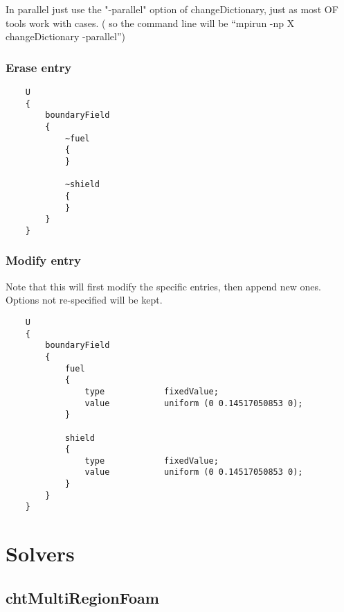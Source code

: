 \documentclass[a4paper, 12pt]{article}
\numberwithin{equation}{section}
\begin{document}
    In parallel just use the "-parallel" option of changeDictionary, just as most OF tools work with cases.
    ( so the command line will be ``mpirun -np X changeDictionary -parallel'')

    \subsubsection{Erase entry}
    \begin{minipage}{\textwidth}
    \vspace{12pt}
    {
    \begin{verbatim}
    U
    {
        boundaryField
        {
            ~fuel
            {
            }

            ~shield
            {
            }
        }
    }
    \end{verbatim}
    }
    \end{minipage}

    \subsubsection{Modify entry}

    Note that this will first modify the specific entries, then append new ones. Options not re-specified will be kept.

    \begin{minipage}{\textwidth}
    \vspace{12pt}
    {
    \begin{verbatim}
    U
    {
        boundaryField
        {
            fuel
            {
                type            fixedValue;
                value           uniform (0 0.14517050853 0);
            }

            shield
            {
                type            fixedValue;
                value           uniform (0 0.14517050853 0);
            }
        }
    }
    \end{verbatim}
    }
    \end{minipage}

\clearpage
\section{Solvers}

    \subsection{chtMultiRegionFoam}
\end{document}

